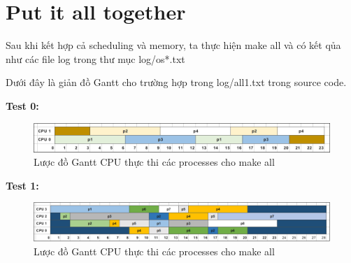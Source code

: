 \section{Put it all together}

Sau khi kết hợp cả scheduling và memory, ta thực hiện make all và có kết qủa như các file log trong thư mục log/os*.txt


Dưới đây là giản đồ Gantt cho trường hợp trong log/all1.txt trong source code.

\textbf{Test 0:}

\vspace{0.5cm}

\begin{figure}[tph]
	\centering
	\includegraphics[width=13cm]{Images/all0.png}
	\vspace{0.5cm}
	\caption{Lược đồ Gantt CPU thực thi các processes cho make all}
	\label{fig:all0}
\end{figure}


\vspace{0.5cm}


\vspace{0.5cm}

\textbf{Test 1:}

\vspace{0.5cm}

\begin{figure}[tph]
	\centering
	\includegraphics[width=15cm]{Images/all1.png}
	\vspace{0.5cm}
	\caption{Lược đồ Gantt CPU thực thi các processes cho make all}
	\label{fig:all1}
\end{figure}

\vspace{0.5cm}
